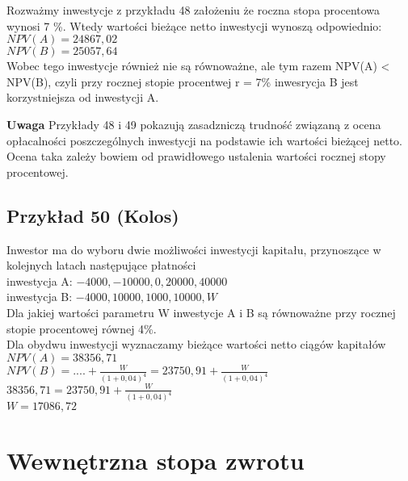 \documentclass{article}
\begin{document}
Rozważmy inwestycje z przykładu 48 założeniu że roczna stopa procentowa wynosi 7 \%. Wtedy wartości bieżące netto inwestycji wynoszą odpowiednio:\\

$ NPV(A) = 24 867,02 $\\

$ NPV(B) = 25 057,64 $\\

Wobec tego inwestycje również nie są równoważne, ale tym razem NPV(A) < NPV(B), czyli przy rocznej stopie procentwej r = 7\% inwesrycja B jest korzystniejsza od inwestycji A.

\textbf{Uwaga} Przykłady 48 i 49 pokazują zasadzniczą trudność związaną z ocena opłacalności poszczególnych inwestycji na podstawie ich wartości bieżącej netto. Ocena taka zależy bowiem od prawidłowego ustalenia wartości rocznej stopy procentowej.

\subsection{Przykład 50 (Kolos)}

Inwestor ma do wyboru dwie możliwości inwestycji kapitału, przynoszące w kolejnych latach następujące płatności\\

inwestycja A: $ -4000, -10000, 0, 20000, 40000 $\\

inwestycja B: $ -4000, 10000, 1000, 10000, W $\\

Dla jakiej wartości parametru W inwestycje A i B są równoważne przy rocznej stopie procentowej równej 4\%.\\

Dla obydwu inwestycji wyznaczamy bieżące wartości netto ciągów kapitałów\\

$ NPV(A) = 38 356,71 $\\

$ NPV(B) = .... + \frac{W}{(1 + 0,04)^4} = 23 750,91 + \frac{W}{(1 + 0,04)^4} $\\

$ 38 356,71 = 23 750,91 + \frac{W}{(1 + 0,04)^4} $\\

$ W = 17086,72 $\\

\newpage

\section{Wewnętrzna stopa zwrotu}
\end{document}
